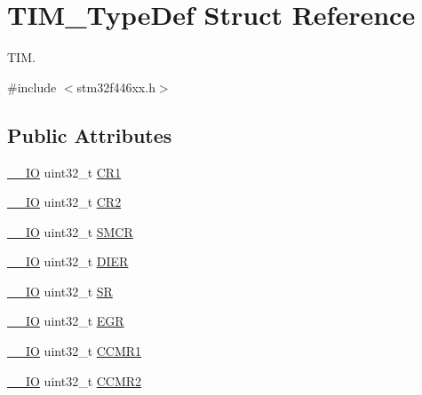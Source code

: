 \hypertarget{struct_t_i_m___type_def}{}\section{T\+I\+M\+\_\+\+Type\+Def Struct Reference}
\label{struct_t_i_m___type_def}


T\+IM.  




{\ttfamily \#include $<$stm32f446xx.\+h$>$}

\subsection*{Public Attributes}
\begin{DoxyCompactItemize}
\item 
\hyperlink{core__sc300_8h_aec43007d9998a0a0e01faede4133d6be}{\+\_\+\+\_\+\+IO} uint32\+\_\+t \hyperlink{struct_t_i_m___type_def_a9dafc8b03e8497203a8bb395db865328}{C\+R1}
\item 
\hyperlink{core__sc300_8h_aec43007d9998a0a0e01faede4133d6be}{\+\_\+\+\_\+\+IO} uint32\+\_\+t \hyperlink{struct_t_i_m___type_def_a6b1ae85138ed91686bf63699c61ef835}{C\+R2}
\item 
\hyperlink{core__sc300_8h_aec43007d9998a0a0e01faede4133d6be}{\+\_\+\+\_\+\+IO} uint32\+\_\+t \hyperlink{struct_t_i_m___type_def_a67d30593bcb68b98186ebe5bc8dc34b1}{S\+M\+CR}
\item 
\hyperlink{core__sc300_8h_aec43007d9998a0a0e01faede4133d6be}{\+\_\+\+\_\+\+IO} uint32\+\_\+t \hyperlink{struct_t_i_m___type_def_a22a33c78ca5bec0e3e8559164a82b8ef}{D\+I\+ER}
\item 
\hyperlink{core__sc300_8h_aec43007d9998a0a0e01faede4133d6be}{\+\_\+\+\_\+\+IO} uint32\+\_\+t \hyperlink{struct_t_i_m___type_def_acedfc978c879835c05ef1788ad26b2ff}{SR}
\item 
\hyperlink{core__sc300_8h_aec43007d9998a0a0e01faede4133d6be}{\+\_\+\+\_\+\+IO} uint32\+\_\+t \hyperlink{struct_t_i_m___type_def_a04248d87f48303fd2267810104a7878d}{E\+GR}
\item 
\hyperlink{core__sc300_8h_aec43007d9998a0a0e01faede4133d6be}{\+\_\+\+\_\+\+IO} uint32\+\_\+t \hyperlink{struct_t_i_m___type_def_a0f2291e7efdf3222689ef13e9be2ea4a}{C\+C\+M\+R1}
\item 
\hyperlink{core__sc300_8h_aec43007d9998a0a0e01faede4133d6be}{\+\_\+\+\_\+\+IO} uint32\+\_\+t \hyperlink{struct_t_i_m___type_def_aa8129ca70a2232c91c8cfcaf375249f6}{C\+C\+M\+R2}
\item 

\end{DoxyCompactItemize}
